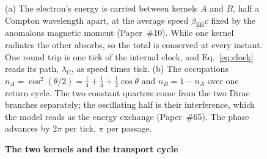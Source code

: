 \documentclass[%
 reprint, amsmath,amssymb, aps, prb, ]{revtex4-2}
\numberwithin{equation}{section}
\newcommand{\iphase}{\theta}
\newcommand{\betaZB}{\beta_{\text{ZB}}}
\newcommand{\lambdaC}{\lambda_{\text{C}}}
\begin{document}
\begin{figure}[t!]
\begin{tikzpicture}
\end{tikzpicture}
\caption{\textbf{The two kernels and the transport cycle}}
\label{fig:cycle_primer}
\vspace{0.4em}
\begin{minipage}{0.95\textwidth}
\justifying\small
(a) The electron's energy is carried between kernels $A$ and $B$, half a Compton wavelength apart, at the average speed $\betaZB c$ fixed by the anomalous magnetic moment (Paper~\#10). While one kernel radiates the other absorbs, so the total is conserved at every instant. One round trip is one tick of the internal clock, and Eq.~\eqref{eq:clock} reads its path, $\lambdaC$, as speed times tick. (b) The occupations $n_A = \cos^{2}(\iphase/2) = \tfrac14 + \tfrac14 + \tfrac12\cos\iphase$ and $n_B = 1 - n_A$ over one return cycle. The two constant quarters come from the two Dirac branches separately; the oscillating half is their interference, which the model reads as the energy exchange (Paper~\#65). The phase advances by $2\pi$ per tick, $\pi$ per passage.
\end{minipage}
\end{figure}
\end{document}
